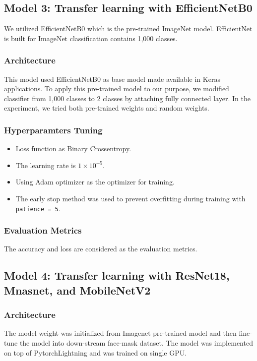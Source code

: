 \documentclass[conference]{IEEEtran}
\begin{document}
\subsection{Model 3: Transfer learning with EfficientNetB0}
We utilized EfficientNetB0\cite{DBLP:journals/corr/abs-1905-11946}  which is the pre-trained ImageNet model. EfficientNet is built for ImageNet classification contains 1,000 classes.
\subsubsection{Architecture}
This model used EfficientNetB0 as base model made available in Keras applications. To apply this pre-trained model to our purpose, we modified classifier from 1,000 classes to 2 classes by attaching fully connected layer. In the experiment, we tried both pre-trained weights and random weights.

\subsubsection{Hyperparamters Tuning}
\begin{itemize}
    \item Loss function as Binary Crossentropy.
    \item The learning rate is $1\times10^{-5}$.
    \item Using Adam optimizer as the optimizer for training. 
    \item The early stop method was used to prevent overfitting during training with \texttt{patience = 5}.
\end{itemize}

\subsubsection{Evaluation Metrics}
The accuracy and loss are considered as the evaluation metrics.


\subsection{Model 4: Transfer learning with ResNet18, Mnasnet, and MobileNetV2}
\subsubsection{Architecture} The model weight was initialized from Imagenet pre-trained model and then fine-tune the model into down-stream face-mask dataset. The model was implemented on top of PytorchLightning and was trained on single GPU.
\end{document}
